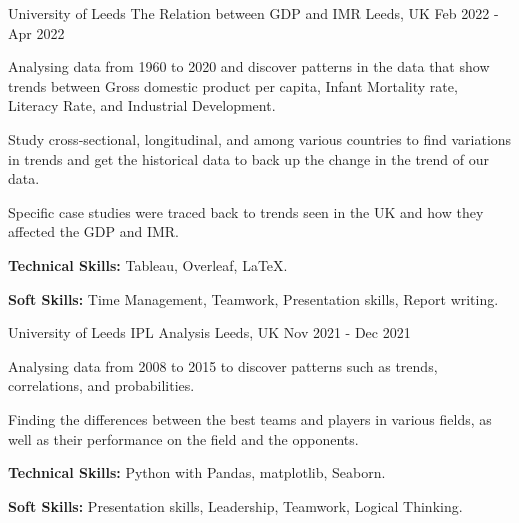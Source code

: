 

\begin{cventries}
  \cventry
    {University of Leeds} %
    {The Relation between GDP and IMR} %
    {Leeds, UK} %
    {Feb 2022 - Apr 2022} %
    {
      \begin{cvitems} %
        \item {Analysing data from 1960 to 2020 and discover patterns in the data that show trends between Gross domestic product per capita, Infant Mortality rate, Literacy Rate, and Industrial Development.}
        \item {Study cross‑sectional, longitudinal, and among various countries to find variations in trends and get the historical data to back up the change in the trend of our data.}
        \item {Specific case studies were traced back to trends seen in the UK and how they affected the GDP and IMR.}
        \item {\textbf{Technical Skills:} Tableau, Overleaf, LaTeX.}
        \item {\textbf{Soft Skills:} Time Management, Teamwork, Presentation skills, Report writing.}
      \end{cvitems}
    }


  \cventry
    {University of Leeds} %
    {IPL Analysis} %
    {Leeds, UK} %
    {Nov 2021 - Dec 2021} %
    {
      \begin{cvitems} %
        \item {Analysing data from 2008 to 2015 to discover patterns such as trends, correlations, and probabilities.}
        \item {Finding the differences between the best teams and players in various fields, as well as their performance on the field and the opponents.}
        \item {\textbf{Technical Skills:} Python with Pandas, matplotlib, Seaborn.}
        \item {\textbf{Soft Skills:} Presentation skills, Leadership, Teamwork, Logical Thinking.}
      \end{cvitems}
    }


\end{cventries}
